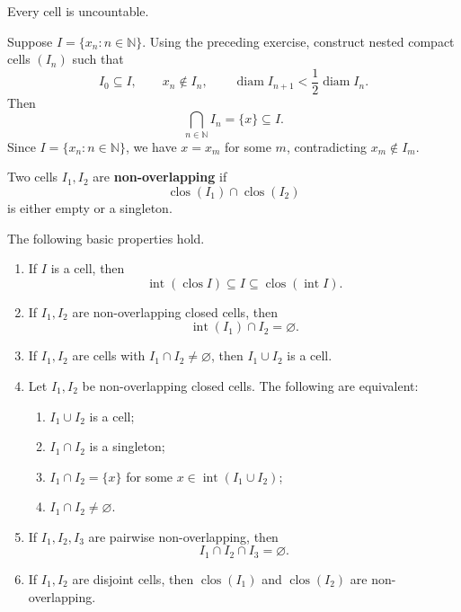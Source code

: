 \begin{theoremenv}
Every cell is uncountable.
\end{theoremenv}

\begin{proofenv}
Suppose $I=\{x_n:n\in\mathbb N\}$.
Using the preceding exercise, construct nested compact cells $(I_n)$ such that
\[
    I_0\subseteq I,\qquad x_n\notin I_n,\qquad
    \operatorname{diam}I_{n+1}<\frac12\operatorname{diam}I_n.
\]
Then
\[
    \bigcap_{n\in\mathbb N}I_n=\{x\}\subseteq I.
\]
Since $I=\{x_n:n\in\mathbb N\}$, we have $x=x_m$ for some $m$, contradicting
$x_m\notin I_m$.
\end{proofenv}


\begin{definitionenv}
Two cells $I_1,I_2$ are \textbf{non-overlapping} if
\[
    \operatorname{clos}(I_1)\cap\operatorname{clos}(I_2)
\]
is either empty or a singleton.
\end{definitionenv}

\begin{propositionenv}
The following basic properties hold.

\begin{enumerate}[label=(\Alph*)]
    \item If $I$ is a cell, then
    \[
        \operatorname{int}(\operatorname{clos}I)
        \subseteq I
        \subseteq
        \operatorname{clos}(\operatorname{int}I).
    \]

    \item If $I_1,I_2$ are non-overlapping closed cells, then
    \[
        \operatorname{int}(I_1)\cap I_2=\varnothing.
    \]

    \item If $I_1,I_2$ are cells with $I_1\cap I_2\ne\varnothing$,
    then $I_1\cup I_2$ is a cell.

    \item Let $I_1,I_2$ be non-overlapping closed cells. The following are
    equivalent:
    \begin{enumerate}[label=(\arabic*)]
        \item $I_1\cup I_2$ is a cell;
        \item $I_1\cap I_2$ is a singleton;
        \item $I_1\cap I_2=\{x\}$ for some $x\in\operatorname{int}(I_1\cup I_2)$;
        \item $I_1\cap I_2\neq\varnothing$.
    \end{enumerate}

    \item If $I_1,I_2,I_3$ are pairwise non-overlapping, then
    \[
        I_1\cap I_2\cap I_3=\varnothing.
    \]

    \item If $I_1,I_2$ are disjoint cells, then
    $\operatorname{clos}(I_1)$ and $\operatorname{clos}(I_2)$ are non-overlapping.
\end{enumerate}
\end{propositionenv}

